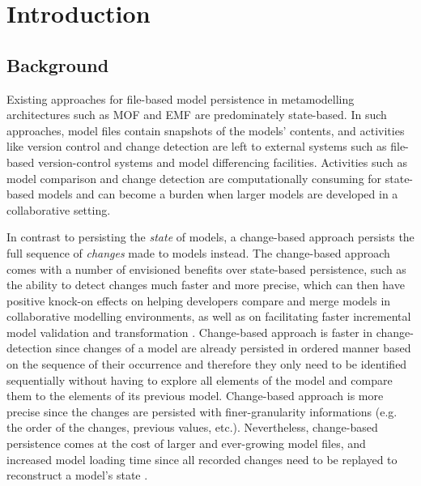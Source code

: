 \documentclass[12pt, a4paper]{report} \usepackage[titletoc]{appendix}
\begin{document}
\tableofcontents
{}

\listoffigures
\newpage
 
\listoftables
\newpage

\lstlistoflistings
\newpage

\chapter{Introduction}
\label{ch:introduction}

\section{Background}
\label{sec:background}
Existing approaches for file-based model persistence in metamodelling architectures such as MOF and EMF are predominately state-based. In such approaches, model files contain snapshots of the models' contents, and activities like version control and change detection are left to external systems such as file-based version-control systems and model differencing facilities. Activities such as model comparison and change detection are computationally consuming for state-based models and can become a burden when larger models are developed in a collaborative setting. 

In contrast to persisting the \emph{state} of models, a change-based approach persists the full sequence of \emph{changes} made to models instead. The change-based approach comes with a number of envisioned benefits over state-based persistence, such as the ability to detect changes much faster and more precise, which can then have positive knock-on effects on helping developers compare and merge models in collaborative modelling environments, as well as on facilitating faster incremental model validation and transformation \cite{rath2012derived,ogunyomi2015property}. Change-based approach is faster in change-detection since changes of a model are already persisted in ordered manner based on the sequence of their occurrence and therefore they only need to be identified sequentially without having to explore all elements of the model and compare them to the elements of its previous model. Change-based approach is more precise since the changes are persisted with finer-granularity informations (e.g. the order of the changes, previous values, etc.). Nevertheless, change-based persistence comes at the cost of larger and ever-growing model files, and increased model loading time since all recorded changes need to be replayed to reconstruct a model's state \cite{yohannis2017turning}.
\end{document}
